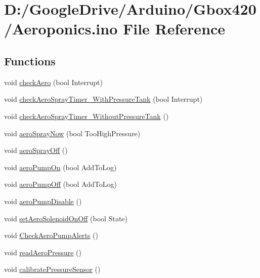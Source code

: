 \hypertarget{_aeroponics_8ino}{}\section{D\+:/\+Google\+Drive/\+Arduino/\+Gbox420/\+Aeroponics.ino File Reference}
\label{_aeroponics_8ino}
\subsection*{Functions}
\begin{DoxyCompactItemize}
\item 
void \mbox{\hyperlink{_aeroponics_8ino_a6739327a66088500872a8ae0595a7972}{check\+Aero}} (bool Interrupt)
\item 
void \mbox{\hyperlink{_aeroponics_8ino_a626742301e1adc19de38ee242058d7f0}{check\+Aero\+Spray\+Timer\+\_\+\+With\+Pressure\+Tank}} (bool Interrupt)
\item 
void \mbox{\hyperlink{_aeroponics_8ino_ae996899811e505867b71dde23b21cb87}{check\+Aero\+Spray\+Timer\+\_\+\+Without\+Pressure\+Tank}} ()
\item 
void \mbox{\hyperlink{_aeroponics_8ino_a4591cb3c1e6630008edce8f01e4bc114}{aero\+Spray\+Now}} (bool Too\+High\+Pressure)
\item 
void \mbox{\hyperlink{_aeroponics_8ino_a4eccc064eadb2c65ea1bb74603bcb27a}{aero\+Spray\+Off}} ()
\item 
void \mbox{\hyperlink{_aeroponics_8ino_af4cfefde32e6a62145a0b74f678f658b}{aero\+Pump\+On}} (bool Add\+To\+Log)
\item 
void \mbox{\hyperlink{_aeroponics_8ino_ac9ad9d76d41d75ac2874ccee33e08a62}{aero\+Pump\+Off}} (bool Add\+To\+Log)
\item 
void \mbox{\hyperlink{_aeroponics_8ino_a6dafc1be1d72b5c0533b7815b3b1b923}{aero\+Pump\+Disable}} ()
\item 
void \mbox{\hyperlink{_aeroponics_8ino_ad61360e89f656048b86e1e6ea838755a}{set\+Aero\+Solenoid\+On\+Off}} (bool State)
\item 
void \mbox{\hyperlink{_aeroponics_8ino_a584e06ce44ecff2d0382e2d4d209e4c1}{Check\+Aero\+Pump\+Alerts}} ()
\item 
void \mbox{\hyperlink{_aeroponics_8ino_a932274759d0784478203f2e863206f95}{read\+Aero\+Pressure}} ()
\item 
void \mbox{\hyperlink{_aeroponics_8ino_a258343773951853857b9e526171efd0b}{calibrate\+Pressure\+Sensor}} ()
\item 

\end{DoxyCompactItemize}
